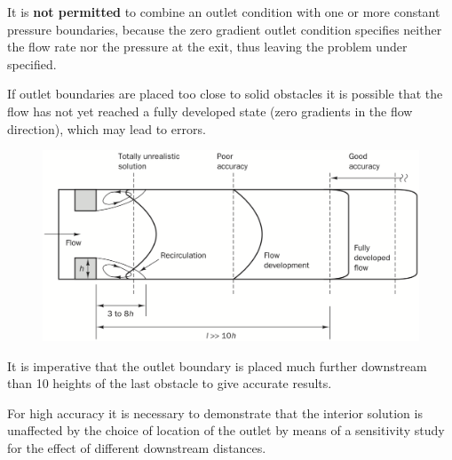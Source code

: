 \documentclass[a4paper, 15pt]{article}
\begin{document}
It
is \textbf{not permitted} to combine an outlet condition with one or more constant pressure
boundaries, because the zero gradient outlet condition specifies neither the flow rate nor the
pressure at the exit, thus leaving the problem under specified. \newline 

If
outlet boundaries are placed too close to solid obstacles it is possible that the flow has not yet
reached a fully developed state (zero gradients in the flow direction), which may lead to errors.
	\begin{figure}[H]
		\centering
		\includegraphics[width=0.5\linewidth]{fig/screenshot032}
		\label{fig:screenshot032}
	\end{figure}
It
is imperative that the outlet boundary is placed much further downstream than 10 heights of
the last obstacle to give accurate results. \newline 

For
high accuracy it is necessary to demonstrate that the interior solution is unaffected by the
choice of location of the outlet by means of a sensitivity study for the effect of different
downstream distances. 	
\end{document}
